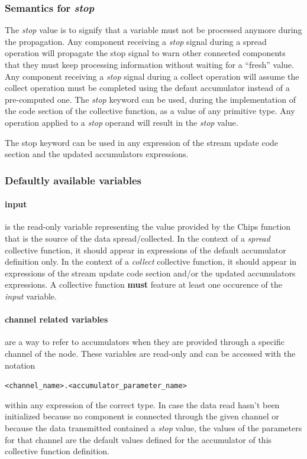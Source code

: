 \documentclass{article}
\begin{document}
\subsubsection{Semantics for \emph{stop}}
The \emph{stop} value is to signify that a variable must not be processed anymore during the propagation. Any component receiving a \emph{stop} signal during a spread operation will propagate the stop signal to warn other connected components that they must keep processing information without waiting for a ``fresh'' value. Any component receiving a \emph{stop} signal during a collect operation will assume the collect operation must be completed using the defaut accumulator instead of a pre-computed one.
The \emph{stop} keyword can be used, during the implementation of the code section of the collective function, as a value of any primitive type. Any operation applied to a \emph{stop} operand will result in the \emph{stop} value.

The stop keyword can be used in any expression of the stream update code section and the updated accumulators expressions.

\subsubsection{Defaultly available variables}

\paragraph{input} is the read-only variable representing the value provided by the Chips function that is the source of the data spread/collected. In the context of a \emph{spread} collective function, it should appear in expressions of the default accumulator definition only. In the context of a \emph{collect} collective function, it should appear in expressions of the stream update code section and/or the updated accumulators expressions. A collective function \textbf{must} feature at least one occurence of the \emph{input} variable.

\paragraph{channel related variables} are a way to refer to accumulators when they are provided through a specific channel of the node. These variables are read-only and can be accessed with the notation
\begin{center}
    \verb'<channel_name>.<accumulator_parameter_name>'
\end{center}
within any expression of the correct type. In case the data read hasn't been initialized because no component is connected through the given channel or because the data transmitted contained a \emph{stop} value, the values of the parameters for that channel are the default values defined for the accumulator of this collective function definition.
\end{document}
